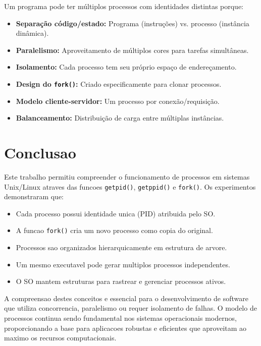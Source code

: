 \documentclass[10pt]{article}
\begin{document}
Um programa pode ter múltiplos processos com identidades distintas porque:

\begin{itemize}\itemsep0em
    \item \textbf{Separação código/estado:} Programa (instruções) vs. processo (instância dinâmica).
    \item \textbf{Paralelismo:} Aproveitamento de múltiplos cores para tarefas simultâneas.
    \item \textbf{Isolamento:} Cada processo tem seu próprio espaço de endereçamento.
    \item \textbf{Design do \texttt{fork()}:} Criado especificamente para clonar processos.
    \item \textbf{Modelo cliente-servidor:} Um processo por conexão/requisição.
    \item \textbf{Balanceamento:} Distribuição de carga entre múltiplas instâncias.
\end{itemize}

\section{Conclusao}

Este trabalho permitiu compreender o funcionamento de processos em sistemas Unix/Linux atraves das funcoes \texttt{getpid()}, \texttt{getppid()} e \texttt{fork()}. Os experimentos demonstraram que:

\begin{itemize}\itemsep0em
    \item Cada processo possui identidade unica (PID) atribuida pelo SO.
    \item A funcao \texttt{fork()} cria um novo processo como copia do original.
    \item Processos sao organizados hierarquicamente em estrutura de arvore.
    \item Um mesmo executavel pode gerar multiplos processos independentes.
    \item O SO mantem estruturas para rastrear e gerenciar processos ativos.
\end{itemize}

A compreensao destes conceitos e essencial para o desenvolvimento de software que utiliza concorrencia, paralelismo ou requer isolamento de falhas. O modelo de processos continua sendo fundamental nos sistemas operacionais modernos, proporcionando a base para aplicacoes robustas e eficientes que aproveitam ao maximo os recursos computacionais.
\end{document}
